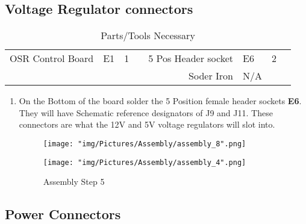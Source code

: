 \documentclass[12pt]{article}
\begin{document}
\subsection{Voltage Regulator connectors}
\begin{table}[H]
    \centering
    \sffamily\footnotesize
    \caption{Parts/Tools Necessary}
    \begin{tabular}{|N|Q|Q|I|N|Q|Q|I|}
        \hline
         &  &  &  &  &  &  &  \\ \hline
        OSR Control Board & E1 & 1 &  & 5 Pos Header socket & E6 & 2 &  \\ \hline
         & & & & Soder Iron & N/A & &  \\ \hline
    \end{tabular}
\end{table}

\begin{enumerate}

\item On the Bottom of the board solder the 5 Position female header sockets \textbf{E6}. They will have Schematic reference designators of J9 and J11. These connectors are what the 12V and 5V voltage regulators will slot into.

\begin{figure}[H]
  \centering
  \begin{minipage}[b]{0.45\textwidth}
    \texttt{[image: "img/Pictures/Assembly/assembly\_8".png]}
  \end{minipage}
  \hfill
  \begin{minipage}[b]{0.45\textwidth}
    \texttt{[image: "img/Pictures/Assembly/assembly\_4".png]}
  \end{minipage}
  \caption{Assembly Step 5}
  \label{assem_5}
\end{figure}


\end{enumerate}

\subsection{Power Connectors}
\end{document}
